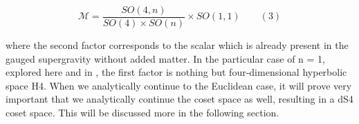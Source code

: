 \documentclass{article}
\begin{document}
\begin{equation}
\mathcal { M } = \frac { S O ( 4, n ) } { S O ( 4 ) \times S O ( n ) } \times S O ( 1, 1 ) \qquad ( 3 )
\end{equation}


where the second factor corresponds to the scalar  which is already present in the gauged
supergravity without added matter. In the particular case of n = 1, explored here and in ,
the first factor is nothing but four-dimensional hyperbolic space H4. When we analytically
continue to the Euclidean case, it will prove very important that we analytically continue
the coset space as well, resulting in a dS4 coset space. This will be discussed more in the
following section.
\end{document}
